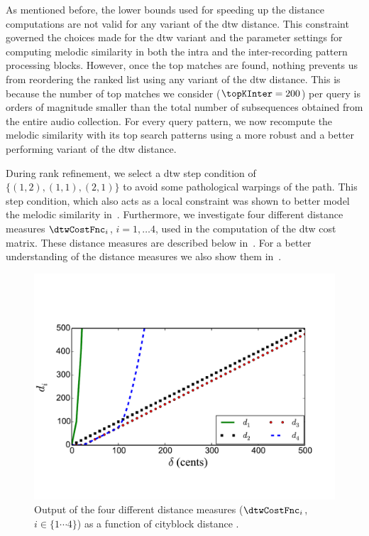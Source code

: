 As mentioned before, the lower bounds used for speeding up the distance computations are not valid for any variant of the \gls{dtw} distance. This constraint governed the choices made for the \gls{dtw} variant and the parameter settings for computing melodic similarity in both the intra and the inter-recording pattern processing blocks. However, once the top matches are found, nothing prevents us from reordering the ranked list using any variant of the \gls{dtw} distance. This is because the number of top matches we consider ($\topKInter=200$) per query is orders of magnitude smaller than the total number of subsequences obtained from the entire audio collection. For every query pattern, we now recompute the melodic similarity with its top \topKInter search patterns using a more robust and a better performing variant of the \gls{dtw} distance.

During rank refinement, we select a \gls{dtw} step condition of $\lbrace(1,2), (1,1), (2,1)\rbrace$ to avoid some pathological warpings of the path. This step condition, which also acts as a local constraint was shown to better model the melodic similarity in~. Furthermore, we investigate four different distance measures $\dtwCostFnc_i$, $i=1,\dots 4$, used in the computation of the \gls{dtw} cost matrix. These distance measures are described below in~. For a better understanding of the distance measures we also show them in~.


\begin{figure}
	\begin{center}
		\includegraphics[width=\figSizeEightyFive]{ch06_patterns/figures/discovery/distances.pdf}
	\end{center}
	\caption[Illustration of output of different distance measures]{Output of the four different distance measures ($\dtwCostFnc_i$, $i \in \lbrace 1\cdots4 \rbrace$) as a function of cityblock distance \pitchDiff.}
	\label{fig:Distances_DTW_discovery}
\end{figure}


